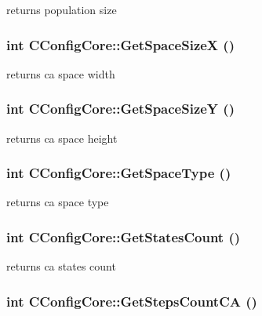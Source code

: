 \label{classCConfigCore_af9e336726122526a8e8e84e45e21ad34}
returns population size \hypertarget{classCConfigCore_aaef0d960846dbe913d073c7aa4634693}{
\subsubsection[{GetSpaceSizeX}]{\setlength{\rightskip}{0pt plus 5cm}int CConfigCore::GetSpaceSizeX ()}}
\label{classCConfigCore_aaef0d960846dbe913d073c7aa4634693}
returns ca space width \hypertarget{classCConfigCore_a0a6cce7f05b9c29afa2986059dc0ecaf}{
\subsubsection[{GetSpaceSizeY}]{\setlength{\rightskip}{0pt plus 5cm}int CConfigCore::GetSpaceSizeY ()}}
\label{classCConfigCore_a0a6cce7f05b9c29afa2986059dc0ecaf}
returns ca space height \hypertarget{classCConfigCore_a8b06869bfd0a1af47fdd3afc517518d1}{
\subsubsection[{GetSpaceType}]{\setlength{\rightskip}{0pt plus 5cm}int CConfigCore::GetSpaceType ()}}
\label{classCConfigCore_a8b06869bfd0a1af47fdd3afc517518d1}
returns ca space type \hypertarget{classCConfigCore_aff904b7ad2955b6ac7632a967ce73058}{
\subsubsection[{GetStatesCount}]{\setlength{\rightskip}{0pt plus 5cm}int CConfigCore::GetStatesCount ()}}
\label{classCConfigCore_aff904b7ad2955b6ac7632a967ce73058}
returns ca states count \hypertarget{classCConfigCore_a70950ba2f607bbc8e31518f07e831aa5}{
\subsubsection[{GetStepsCountCA}]{\setlength{\rightskip}{0pt plus 5cm}int CConfigCore::GetStepsCountCA ()}}
